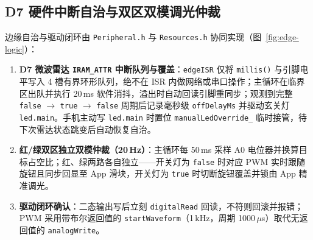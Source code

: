 \documentclass[10.5pt,a4paper]{ctexart}
\newcommand{\code}[1]{{\ttfamily\small\nolinkurl{#1}}}
\begin{document}
\subsection{D7 硬件中断自治与双区双模调光仲裁}
边缘自治与驱动闭环由 \code{Peripheral.h} 与 \code{Resources.h} 协同实现（图~\ref{fig:edge-logic}）：
\begin{enumerate}
    \item \textbf{D7 微波雷达 \code{IRAM_ATTR} 中断队列与覆盖}：\code{edgeISR} 仅将 \code{millis()} 与引脚电平写入 4 槽有界环形队列，绝不在 ISR 内做网络或串口操作；主循环在临界区出队并执行 20\,ms 软件消抖，溢出时自动回读引脚重同步；观测到完整 \texttt{false} $\to$ \texttt{true} $\to$ \texttt{false} 周期后记录毫秒级 \code{offDelayMs} 并驱动玄关灯 \code{led.main}。手机主动写 \code{led.main} 时置位 \code{manualLedOverride_} 临时接管，待下次雷达状态跳变后自动恢复自治。
    \item \textbf{红/绿双区独立双模仲裁（20\,Hz）}：主循环每 50\,ms 采样 A0 电位器并换算目标占空比；红、绿两路各自独立——开关灯为 \code{false} 时对应 PWM 实时跟随旋钮且同步回显至 App 滑块，开关灯为 \code{true} 时切断旋钮覆盖并锁由 App 精准调光。
    \item \textbf{驱动闭环确认}：二态输出写后立刻 \code{digitalRead} 回读，不符则回滚并报错；PWM 采用带布尔返回值的 \code{startWaveform}（1\,kHz，周期 1000\,$\mu$s）取代无返回值的 \code{analogWrite}。
\end{enumerate}
\end{document}
